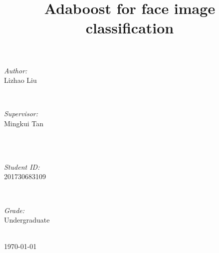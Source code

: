 \documentclass[journal, a4paper]{IEEEtran}
\begin{document}
\begin{titlepage}
\begin{minipage}{0.4\textwidth}
\begin{flushleft} \large
\emph{Author:}\\
Lizhao Liu %
\end{flushleft}
\end{minipage}
~
\begin{minipage}{0.4\textwidth}
\begin{flushright} \large
\emph{Supervisor:} \\
Mingkui Tan %
\end{flushright}
\end{minipage}\\[2cm]
~
\begin{minipage}{0.4\textwidth}
\begin{flushleft} \large
\emph{Student ID:}\\
201730683109
\end{flushleft}
\end{minipage}
~
\begin{minipage}{0.4\textwidth}
\begin{flushright} \large
\emph{Grade:} \\
Undergraduate
\end{flushright}
\end{minipage}\\[2cm]



{\large \today}\\[2cm] %

 

\vfill %

\end{titlepage}

	\title{Adaboost for face image classification}
	\maketitle
\end{document}
